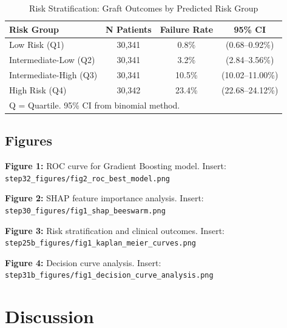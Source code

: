 \documentclass[11pt,a4paper]{article}
\begin{document}
\begin{table}[H]
\centering
\caption{Risk Stratification: Graft Outcomes by Predicted Risk Group}
\label{tab:risk_stratification}
\small
\begin{tabular}{lccc}
\toprule
\textbf{Risk Group} & 
\textbf{N Patients} & 
\textbf{Failure Rate} & 
\textbf{95\% CI} \\
\midrule
Low Risk (Q1) & 30,341 & 0.8\% & (0.68–0.92\%) \\
Intermediate-Low (Q2) & 30,341 & 3.2\% & (2.84–3.56\%) \\
Intermediate-High (Q3) & 30,341 & 10.5\% & (10.02–11.00\%) \\
High Risk (Q4) & 30,342 & 23.4\% & (22.68–24.12\%) \\
\bottomrule
\multicolumn{4}{l}{\footnotesize Q = Quartile. 95\% CI from binomial method.}
\end{tabular}
\end{table}

\subsection{Figures}

\textbf{Figure 1:} ROC curve for Gradient Boosting model. Insert: \texttt{step32\_figures/fig2\_roc\_best\_model.png}

\textbf{Figure 2:} SHAP feature importance analysis. Insert: \texttt{step30\_figures/fig1\_shap\_beeswarm.png}

\textbf{Figure 3:} Risk stratification and clinical outcomes. Insert: \texttt{step25b\_figures/fig1\_kaplan\_meier\_curves.png}

\textbf{Figure 4:} Decision curve analysis. Insert: \texttt{step31b\_figures/fig1\_decision\_curve\_analysis.png}

\section{Discussion}
\end{document}
